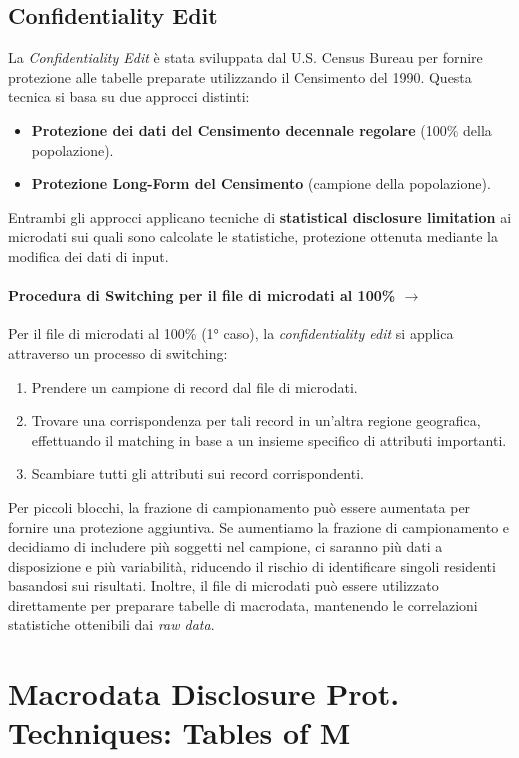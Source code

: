 \documentclass{report}
\begin{document}
\subsection{Confidentiality Edit}
La \textit{Confidentiality Edit} è stata sviluppata dal U.S. Census Bureau per fornire protezione alle tabelle preparate utilizzando il Censimento del 1990. Questa tecnica si basa su due approcci distinti:
\begin{itemize}
    \item \textbf{Protezione dei dati del Censimento decennale regolare} (100\% della popolazione).
    \item \textbf{Protezione Long-Form del Censimento} (campione della popolazione).
\end{itemize}

\noindent Entrambi gli approcci applicano tecniche di \textbf{statistical disclosure limitation} ai microdati sui quali sono calcolate le statistiche, protezione ottenuta mediante la modifica dei dati di input.

\paragraph{Procedura di Switching per il file di microdati al 100\% $\rightarrow$} 
Per il file di microdati al 100\% (1° caso), la \textit{confidentiality edit} si applica attraverso un processo di switching:
\begin{enumerate}
    \item Prendere un campione di record dal file di microdati.
    \item Trovare una corrispondenza per tali record in un'altra regione geografica, effettuando il matching in base a un insieme specifico di attributi importanti.
    \item Scambiare tutti gli attributi sui record corrispondenti.
\end{enumerate}

\noindent Per piccoli blocchi, la frazione di campionamento può essere aumentata per fornire una protezione aggiuntiva. 
Se aumentiamo la frazione di campionamento e decidiamo di includere più soggetti nel campione, ci saranno più dati a disposizione e più variabilità, 
riducendo il rischio di identificare singoli residenti basandosi sui risultati. Inoltre, il file di microdati può essere utilizzato direttamente per preparare tabelle di macrodata, 
mantenendo le correlazioni statistiche ottenibili dai  \textit{raw data}.


\section{Macrodata Disclosure Prot. Techniques: Tables of M}
\end{document}
